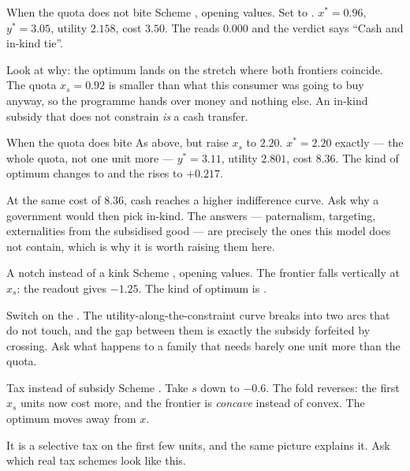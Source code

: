 \documentclass[11pt,a4paper]{appletmanual}
\begin{document}
\begin{activity}{When the quota does not bite}
\amset Scheme , opening values. Set
 to .
\amexp $x^\ast = 0.96$, $y^\ast = 3.05$, utility $2.158$, cost $3.50$. The
 reads $0.000$ and the verdict says ``Cash and in-kind
tie''.
\par\smallskip
Look at why: the optimum lands on the stretch where both frontiers coincide.
The quota $x_s = 0.92$ is smaller than what this consumer was going to buy
anyway, so the programme hands over money and nothing else. An in-kind subsidy
that does not constrain \emph{is} a cash transfer.
\end{activity}

\begin{activity}{When the quota does bite}
\amset As above, but raise $x_s$ to $2.20$.
\amexp $x^\ast = 2.20$ exactly --- the whole quota, not one unit more ---
$y^\ast = 3.11$, utility $2.801$, cost $8.36$. The kind of optimum changes to
 and the  rises to $+0.217$.
\par\smallskip
At the same cost of $8.36$, cash reaches a higher indifference curve. Ask why a
government would then pick in-kind. The answers --- paternalism, targeting,
externalities from the subsidised good --- are precisely the ones this model
does not contain, which is why it is worth raising them here.
\end{activity}

\begin{activity}{A notch instead of a kink}
\amset Scheme , opening values.
\amexp The frontier falls vertically at $x_s$: the  readout
gives $-1.25$. The kind of optimum is .
\par\smallskip
Switch on the . The utility-along-the-constraint curve
breaks into two arcs that do not touch, and the gap between them is exactly the
subsidy forfeited by crossing. Ask what happens to a family that needs barely
one unit more than the quota.
\end{activity}

\begin{activity}{Tax instead of subsidy}
\amset Scheme . Take $s$ down to $-0.6$.
\amexp The fold reverses: the first $x_s$ units now cost more, and the frontier
is \emph{concave} instead of convex. The optimum moves away from $x$.
\par\smallskip
It is a selective tax on the first few units, and the same picture explains it.
Ask which real tax schemes look like this.
\end{activity}
\end{document}
